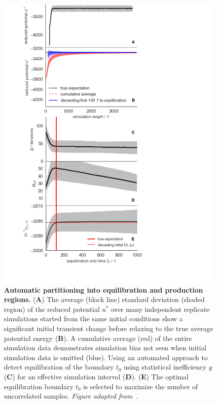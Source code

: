 \documentclass[9pt,bestpractices]{livecoms}
\begin{document}
\begin{figure}
    \centering
    \includegraphics[width=0.95\linewidth]{figures/fig11_equib_detection/Figure.pdf}
    \caption{{\bf Automatic partitioning into equilibration and production regions.}
    (\textbf{A}) The average (black line) standard deviation (shaded region) of the reduced potential $u^*$ over many independent replicate simulations started from the same initial conditions show a significant initial transient change before relaxing to the true average potential energy (\textbf{B}). A cumulative average (red) of the entire simulation data demonstrates simulation bias not seen when initial simulation data is omitted (blue). Using an automated approach to detect equilibration of the boundary $t_0$ using statistical inefficiency $g$ (\textbf{C})  for an effective simulation interval (\textbf{D}). (\textbf{E}) The optimal equilibration boundary $t_0$ is selected to maximize the number of uncorrelated samples.
    \emph{Figure adapted from~\cite{chodera2016simple}.}
    }
    \label{fig:automatic-equilibration-detection}
\end{figure}
\end{document}
